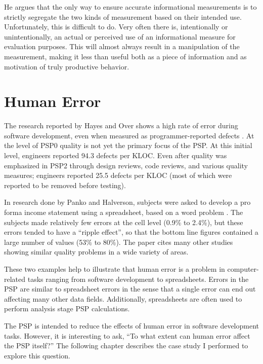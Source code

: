 He argues that the only way to ensure accurate informational measurements
is to strictly segregate the two kinds of measurement based on their
intended use.  Unfortunately, this is difficult to do.  Very often there
is, intentionally or unintentionally, an actual or perceived use of an
informational measure for evaluation purposes.  This will almost always
result in a manipulation of the measurement, making it less than useful
both as a piece of information and as motivation of truly productive
behavior.

\section{Human Error}

The research reported by Hayes and Over shows a high rate of error during
software development, even when measured as programmer-reported defects
\cite{CMU97}.  At the level of PSP0 quality is not yet the primary focus of
the PSP.  At this initial level, engineers reported 94.3 defects per KLOC.
Even after quality was emphasized in PSP2 through design reviews, code
reviews, and various quality measures; engineers reported 25.5 defects per
KLOC (most of which were reported to be removed before testing).

\newpage
In research done by Panko and Halverson, subjects were asked to develop a
pro forma income statement using a spreadsheet, based on a word problem
\cite{Panko96}.  The subjects made relatively few errors at the cell level
(0.9\% to 2.4\%), but these errors tended to have a ``ripple effect'', so
that the bottom line figures contained a large number of values (53\% to
80\%).  The paper cites many other studies showing similar quality problems
in a wide variety of areas.

These two examples help to illustrate that human error is a problem in
computer-related tasks ranging from software development to spreadsheets.
Errors in the PSP are similar to spreadsheet errors in the sense that a
single error can end out affecting many other data fields.  Additionally,
spreadsheets are often used to perform analysis stage PSP calculations. 

The PSP is intended to reduce the effects of human error in software
development tasks.  However, it is interesting to ask, ``To what extent can
human error affect the PSP itself?''  The following chapter describes the
case study I performed to explore this question.

